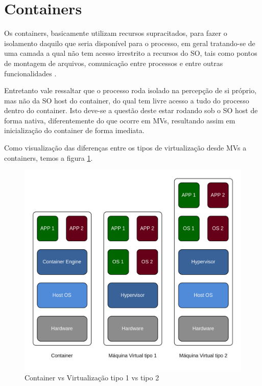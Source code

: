 \section{Containers}
\label{chp:referencial_teorico::sct:containers}
Os containers, basicamente utilizam recursos supracitados, para fazer o isolamento daquilo que seria disponível para o processo, em geral tratando-se de uma camada a qual não tem acesso irrestrito a recursos do SO, tais como pontos de montagem de arquivos, comunicação entre processos e entre outras funcionalidades \cite{what-container, what-are-container}.

Entretanto vale ressaltar que o processo roda isolado na percepção de si próprio, mas não da SO host do container, do qual tem livre acesso a tudo do processo dentro do container. Isto deve-se a questão deste estar rodando sob o SO host de forma nativa, diferentemente do que ocorre em MVs, resultando assim em inicialização do container de forma imediata.

Como visualização das diferenças entre os tipos de virtualização desde MVs a containers, temos a figura \ref{fig:container_vs_virt_t1_vs_virt_t2}.

\begin{figure}
    \centering
    \includegraphics[width=12cm]{images/virt_container_vs_t1_vs_t2.drawio.png}
    \caption{Container vs Virtualização tipo 1 vs tipo 2}
    \label{fig:container_vs_virt_t1_vs_virt_t2}
\end{figure}

